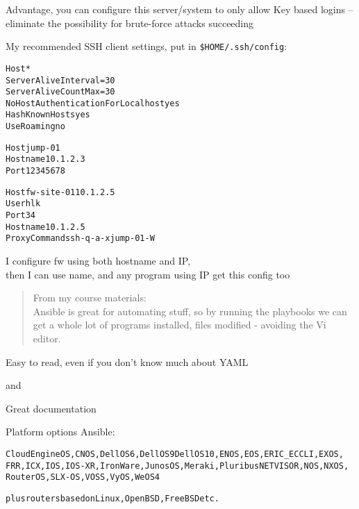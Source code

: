 \documentclass[Screen16to9,17pt]{foils}
\begin{document}

Advantage, you can configure this server/system to only allow Key based logins -- eliminate the possibility for brute-force attacks succeeding


My recommended SSH client settings, put in \verb+$HOME/.ssh/config+:
\begin{alltt}\footnotesize
Host *
    ServerAliveInterval=30
    ServerAliveCountMax=30
    NoHostAuthenticationForLocalhost yes
    HashKnownHosts yes
    UseRoaming no

Host jump-01
  Hostname 10.1.2.3
  Port 12345678

Host fw-site-01 10.1.2.5
  User hlk
  Port 34
  Hostname 10.1.2.5
  ProxyCommand ssh -q -a -x jump-01 -W %h:%p
\end{alltt}

I configure fw using both hostname and IP,\\
then I can use name, and any program using IP get this config too





\begin{quote}
From my course materials:\\
Ansible is great for automating stuff, so by running the playbooks we can get a whole lot of programs installed, files modified - avoiding the Vi editor.
\end{quote}

\begin{list2}
\item Easy to read, even if you don't know much about YAML
\item {} and 
\item Great documentation\\
\end{list2}




Platform options Ansible:
\begin{alltt}
CloudEngine OS, CNOS, Dell OS6, Dell OS9 Dell OS10, ENOS, EOS, ERIC_ECCLI, EXOS,
FRR, ICX, IOS, IOS-XR, IronWare, Junos OS, Meraki, Pluribus NETVISOR, NOS, NXOS,
RouterOS, SLX-OS, VOSS, VyOS, WeOS 4

plus routers based on Linux, OpenBSD, FreeBSD etc.
\end{alltt}
\end{document}
